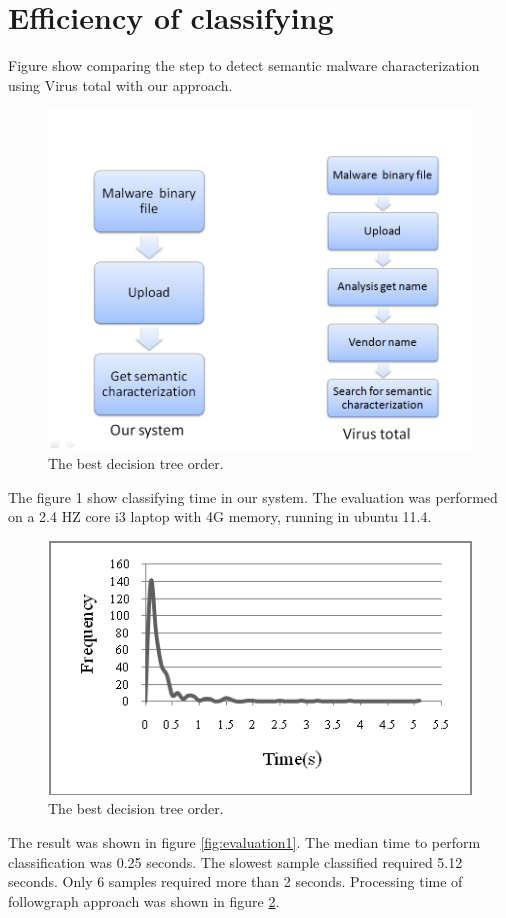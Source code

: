 \section{Efficiency of classifying}
Figure show comparing the step to detect semantic malware characterization using Virus total with our approach.
 \begin{figure}[httb]
  \centering
    \includegraphics[width=1\textwidth]{graph/evaluation3.png}
     \caption{The best decision tree order.}
     \label{fig:evaluation3}
\end{figure}

The figure 1 show classifying time in our system. The evaluation was performed on a 2.4 HZ core i3 laptop with 4G memory, running in ubuntu 11.4. 	

\begin{figure}[httb]
  \centering
    \includegraphics[width=1\textwidth]{graph/evaluation2.png}
     \caption{The best decision tree order.}
     \label{fig:evaluation2}
\end{figure}
The result was shown in figure \ref{fig:evaluation1}. The median time to perform classification was 0.25 seconds. The slowest sample classified required 5.12 seconds. Only 6 samples required more than 2 seconds. Processing time of followgraph approach was shown in figure \ref{fig:evaluation2}.

